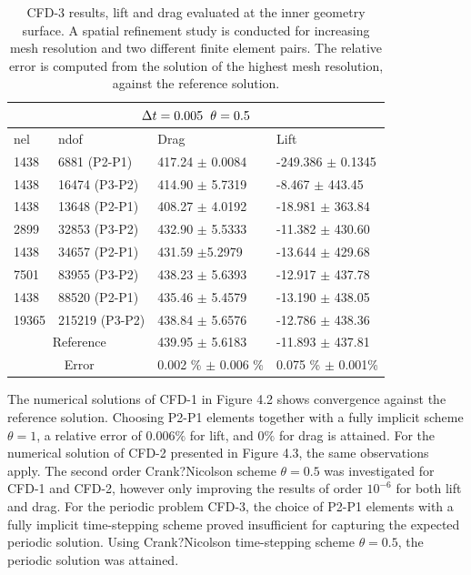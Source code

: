 \begin{table}[h!]
\centering
\label{CFD-32 Results}
 \begin{tabular}{ |p{1cm}||p{2.9cm}|p{3.3cm}|p{3.3cm}|}
  \hline
  \multicolumn{4}{|c|}{$\Delta t = 0.005 \hspace{2mm} \theta = 0.5$} \\
   \hline
nel & ndof & Drag  & Lift \\
\hline
 1438    & 6881  (P2-P1)   &  417.24  $\pm$  0.0084 & -249.386   $\pm$ 0.1345  \\
 1438    & 16474 (P3-P2)   & 414.90     $\pm$  5.7319 & -8.467 $\pm$  443.45  \\
\hline
 1438    &13648  (P2-P1)   & 408.27   $\pm$ 4.0192 & -18.981   $\pm$ 363.84 \\
 2899    &  32853 (P3-P2)   & 432.90      $\pm$  5.5333 & -11.382      $\pm$  430.60 \\
 \hline
 1438    & 34657  (P2-P1)   & 431.59 $\pm$5.2979 & -13.644   $\pm$ 429.68 \\
 7501    & 83955 (P3-P2)  & 438.23      $\pm$  5.6393 & -12.917 $\pm$  437.78 \\
 \hline
 1438    & 88520  (P2-P1)   & 435.46  $\pm$ 5.4579 & -13.190   $\pm$ 438.05 \\
 19365   & 215219 (P3-P2)  & 438.84    $\pm$  5.6576 & -12.786      $\pm$  438.36 \\
\hline
 \multicolumn{2}{|c|}{Reference}  & 439.95 $\pm$ 5.6183 & -11.893 $\pm$ 437.81\\
 \hline
  \multicolumn{2}{|c|}{Error}  & 0.002 \% $\pm$ 0.006 \% & 0.075 \% $\pm$ 0.001\% \\
  \hline
\end{tabular}
\caption{CFD-3 results, lift and drag evaluated at the inner geometry surface. A spatial refinement study is conducted for increasing mesh resolution and two different finite element pairs. The relative error is computed from the solution of the highest mesh resolution, against the reference solution.}
\label{table:cfd32}
\end{table}
\newpage
The numerical solutions of CFD-1 in Figure 4.2 shows convergence against the reference solution. Choosing P2-P1 elements together with a fully implicit scheme $\theta = 1$, a relative error of $0.006 \%$ for lift, and $0\%$ for drag is attained. For the numerical solution of CFD-2 presented in Figure 4.3, the same observations apply. The second order Crank?Nicolson scheme  $\theta = 0.5$ was investigated for CFD-1 and CFD-2, however only improving the results of order $10^{-6}$ for both lift and drag. For the periodic problem CFD-3, the choice of  P2-P1 elements with a fully implicit time-stepping scheme proved insufficient for capturing the expected periodic solution. Using Crank?Nicolson time-stepping scheme $\theta = 0.5$, the periodic solution was attained. 
